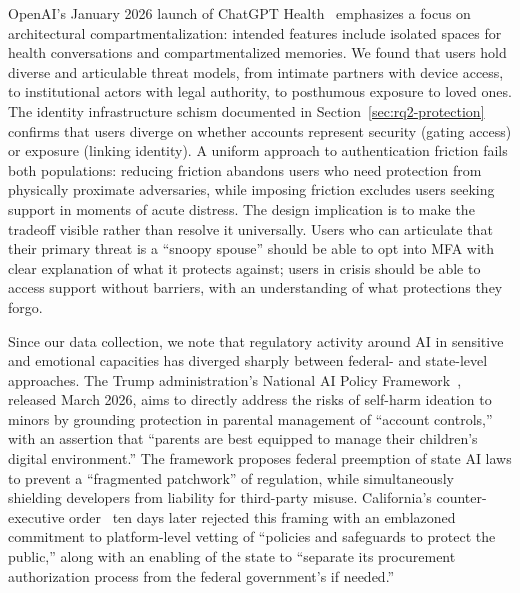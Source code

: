 \documentclass[letterpaper,twocolumn,10pt]{article}
\begin{document}
 OpenAI's January 2026 launch of ChatGPT Health~\cite{openai2026health} emphasizes a focus on architectural compartmentalization: intended features include isolated spaces for health conversations and compartmentalized memories. We found that users hold diverse and articulable threat models, from intimate partners with device access, to institutional actors with legal authority, to posthumous exposure to loved ones. The identity infrastructure schism documented in Section~\ref{sec:rq2-protection} confirms that users diverge on whether accounts represent security (gating access) or exposure (linking identity). A uniform approach to authentication friction fails both populations: reducing friction abandons users who need protection from physically proximate adversaries, while imposing friction excludes users seeking support in moments of acute distress. The design implication is to make the tradeoff visible rather than resolve it universally. Users who can articulate that their primary threat is a ``snoopy spouse'' should be able to opt into MFA with clear explanation of what it protects against; users in crisis should be able to access support without barriers, with an understanding of what protections they forgo.

 Since our data collection, we note that regulatory activity around AI in sensitive and emotional capacities has diverged sharply between federal- and state-level approaches. The Trump administration's National AI Policy Framework~\cite{trump2026aiframework}, released March 2026, aims to directly address the risks of self-harm ideation to minors by grounding protection in parental management of ``account controls,'' with an assertion that ``parents are best equipped to manage their children's digital environment.'' The framework proposes federal preemption of state AI laws to prevent a ``fragmented patchwork'' of regulation, while simultaneously shielding developers from liability for third-party misuse. California's counter-executive order~\cite{newsom2026eo} ten days later rejected this framing with an emblazoned commitment to platform-level vetting of ``policies and safeguards to protect the public,'' along with an enabling of the state to ``separate its procurement authorization process from the federal government's if needed.'' 
\end{document}
